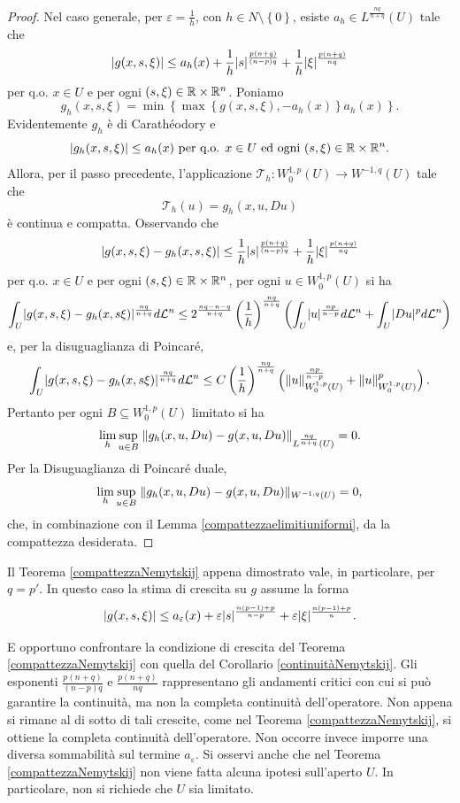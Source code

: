 \begin{proof}
Nel caso generale, per $\varepsilon = \frac{1}{h}$, con $h \in N\setminus\left\lbrace 0\right\rbrace$, esiste $a_h \in L^{\frac{nq}{n+q}}(U)$ tale che 
	\[ \lvert g(x,s,\xi)\rvert \le a_h(x) + \frac{1}{h}\lvert s\rvert^{\frac{p(n+q)}{(n-p)q}} + \frac{1}{h} \lvert\xi\rvert^{\frac{p(n+q)}{nq}} \]
per q.o. $x \in U$ e per ogni $(s,\xi) \in \mathbb{R} \times \mathbb{R}^n$. Poniamo 
\[ g_h(x,s,\xi) = \min \left\lbrace \max\left\lbrace g(x,s,\xi),-a_h(x)\right\rbrace a_h(x)\right\rbrace.  \]
Evidentemente $ g_h$ è di Carathéodory e 
\[ \lvert g_h(x,s,\xi)\rvert \le a_h(x) \textup{ per q.o. } x \in U \textup{ ed ogni } (s,\xi) \in \mathbb{R}\times \mathbb{R}^n. \]
Allora, per il passo precedente, l'applicazione $\mathcal{T}_h: W^{1,p}_0(U) \to W^{-1,q}(U)$ tale che
\[ \mathcal{T}_h(u) = g_h(x,u,Du) \]
è continua e compatta. Osservando che 
\[ \lvert g(x,s,\xi) - g_h(x,s,\xi)\rvert \le \frac{1}{h}\lvert s\rvert^{\frac{p(n+q)}{(n-p)q}} + \frac{1}{h} \lvert\xi\rvert^{\frac{p(n+q)}{nq}} \]
per q.o. $x \in U$ e per ogni $(s,\xi) \in \mathbb{R} \times \mathbb{R}^n$, per ogni $u \in W^{1,p}_0(U)$ si ha
\[ \int_U \lvert g(x,s,\xi) - g_h(x,s\xi)\rvert^{\frac{nq}{n+q}} d\mathcal{L}^n \le 2^{\frac{nq-n-q}{n+q}}\left(\frac{1}{h} \right)^{\frac{nq}{n+q}} \left(\int_U \lvert u\rvert^\frac{np}{n-p} d\mathcal{L}^n + \int_U \lvert Du\rvert^p d\mathcal{L}^n \right)  \]
e, per la disuguaglianza di Poincaré,
\[ \int_U \lvert g(x,s,\xi) - g_h(x,s\xi)\rvert^{\frac{nq}{n+q}} d\mathcal{L}^n \le C \left(\frac{1}{h} \right)^{\frac{nq}{n+q}}\left( \lVert u\rVert_{W^{1,p}_0(U)}^{\frac{np}{n-p}} + \lVert u\rVert_{W^{1,p}_0(U)}^p\right).   \]
Pertanto per ogni $B \subseteq W^{1,p}_0(U)$ limitato si ha
\[ \lim\limits_{h} \underset{u \in B}{\sup}\; \lVert g_h(x,u,Du) -g(x,u,Du)\rVert_{L^{\frac{nq}{n+q}}(U)} = 0.  \]
Per la Disuguaglianza di Poincaré duale, 
\[ \lim\limits_{h} \underset{u \in B}{\sup}\; \lVert g_h(x,u,Du) -g(x,u,Du)\rVert_{W^{-1,q}(U)} = 0,  \]
che, in combinazione con il Lemma \eqref{compattezzaelimitiuniformi}, da la compattezza desiderata.
\end{proof}

\begin{osservazione}
	Il Teorema \eqref{compattezzaNemytskij} appena dimostrato vale, in particolare, per $q = p'$. In questo caso la stima di crescita su $g$ assume la forma
		\[ \lvert g(x,s,\xi)\rvert \le a_\varepsilon(x) + \varepsilon\lvert s\rvert^{\frac{n(p-1)+p}{n-p}} + \varepsilon \lvert\xi\rvert^{\frac{n(p-1)+p}{n}}. \]
\end{osservazione}

\begin{osservazione}
E opportuno confrontare la condizione di crescita del Teorema \eqref{compattezzaNemytskij} con quella del Corollario \eqref{continuitàNemytskij}. Gli esponenti $\frac{p(n+q)}{(n-p)q}$ e $\frac{p(n+q)}{nq}$ rappresentano gli andamenti critici con cui si può garantire la continuità, ma non la completa continuità dell’operatore. Non appena si rimane al di sotto di tali crescite, come nel Teorema \eqref{compattezzaNemytskij}, si ottiene la completa continuità dell’operatore. Non occorre invece imporre una diversa
sommabilità sul termine $a_\varepsilon$. Si osservi anche che nel Teorema \eqref{compattezzaNemytskij} non viene fatta alcuna ipotesi sull’aperto $U$.
In particolare, non si richiede che $U$ sia limitato.
\end{osservazione}


